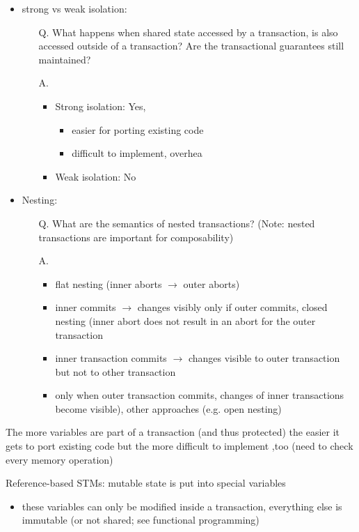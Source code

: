 \documentclass[a4paper]{article}
\begin{document}
\begin{itemize}
\item strong vs weak isolation:
\begin{enumerate}
\item[Q.] What happens when shared state accessed by a transaction, is also accessed outside of a transaction? Are the transactional guarantees still maintained? 
\item[A.]
\begin{itemize}
\item Strong isolation: Yes, 
\begin{itemize}
\item easier for porting existing code
\item difficult to implement, overhea
\end{itemize}
\item Weak isolation: No
\end{itemize}
\end{enumerate}
\item Nesting:
\begin{enumerate}
\item[Q.] What are the semantics of nested transactions? (Note: nested transactions are important for composability)
\item[A.]
\begin{itemize}
\item flat nesting (inner aborts $\rightarrow$ outer aborts)
\item inner commits $\rightarrow$ changes visibly only if outer commits, closed nesting (inner abort does not result in an abort for the outer transaction
\item inner transaction commits $\rightarrow$ changes visible to outer transaction but not to other transaction
\item only when outer transaction commits, changes of inner transactions become visible), other approaches (e.g. open nesting)
\end{itemize}
\end{enumerate}
\end{itemize}
\item The more variables are part of a transaction (and thus protected) the easier it gets to port existing code but the more difficult to implement ,too (need to check every memory operation)
\item Reference-based STMs: mutable state is put into special variables
\begin{itemize}
\item  these variables can only be modified inside a transaction, everything else is immutable (or not shared; see functional programming)
\end{itemize}
\end{document}
